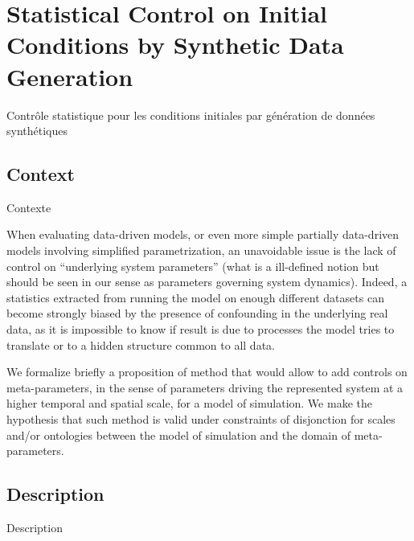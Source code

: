 








\newpage




\section{Statistical Control on Initial Conditions by Synthetic Data Generation}{Contrôle statistique pour les conditions initiales par génération de données synthétiques}

\subsection{Context}{Contexte}

When evaluating data-driven models, or even more simple partially data-driven models involving simplified parametrization, an unavoidable issue is the lack of control on ``underlying system parameters'' (what is a ill-defined notion but should be seen in our sense as parameters governing system dynamics). Indeed, a statistics extracted from running the model on enough different datasets can become strongly biased by the presence of confounding in the underlying real data, as it is impossible to know if result is due to processes the model tries to translate or to a hidden structure common to all data.


We formalize briefly a proposition of method that would allow to add controls on meta-parameters, in the sense of parameters driving the represented system at a higher temporal and spatial scale, for a model of simulation. We make the hypothesis that such method is valid under constraints of disjonction for scales and/or ontologies between the model of simulation and the domain of meta-parameters.


\subsection{Description}{Description}

